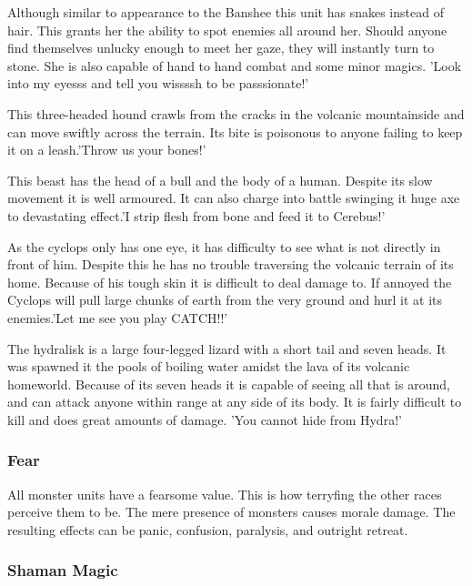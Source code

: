 \documentclass[a4paper]{article}
\begin{document}
Although similar to appearance to the Banshee this unit has snakes instead of hair. This grants her the ability to spot enemies all around her. Should anyone find themselves unlucky enough to meet her gaze, they will instantly turn to stone. She is also capable of hand to hand combat and some minor magics. 'Look into my eyesss and tell you wissssh to be passsionate!'

This three-headed hound crawls from the cracks in the volcanic mountainside and can move swiftly across the terrain. Its bite is poisonous to anyone failing to keep it on a leash.'Throw us your bones!'

This beast has the head of a bull and the body of a human. Despite its slow movement it is well armoured. It can also charge into battle swinging it huge axe to devastating effect.'I strip flesh from bone and feed it to Cerebus!'

As the cyclops only has one eye, it has difficulty to see what is not directly in front of him. Despite this he has no trouble traversing the volcanic terrain of its home. Because of his tough skin it is difficult to deal damage to. If annoyed the Cyclops will pull large chunks of earth from the very ground and hurl it at its enemies.'Let me see you play CATCH!!'

The hydralisk is a large four-legged lizard with a short tail and seven heads. It was spawned it the pools of boiling water amidst the lava of its volcanic homeworld. Because of its seven heads it is capable of seeing all that is around, and can attack anyone within range at any side of its body. It is fairly difficult to kill and does great amounts of damage. 'You cannot hide from Hydra!'

\subsubsection{Fear}

All monster units have a fearsome value. This is how terryfing the other races perceive them to be. The mere presence of monsters causes morale damage. The resulting effects can be panic, confusion, paralysis, and outright retreat.

\subsubsection{Shaman Magic}
\end{document}

